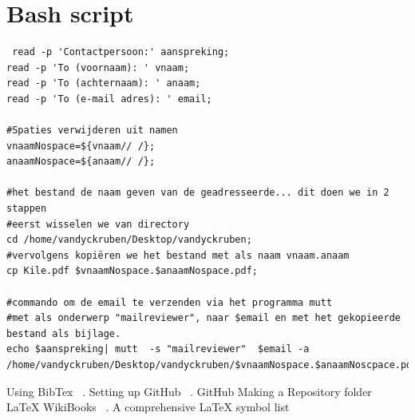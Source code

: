 \documentclass[12pt]{article} %
\begin{document}
\section{Bash script}
\begin{lstlisting}
 read -p 'Contactpersoon:' aanspreking;
read -p 'To (voornaam): ' vnaam;
read -p 'To (achternaam): ' anaam;
read -p 'To (e-mail adres): ' email;

#Spaties verwijderen uit namen
vnaamNospace=${vnaam// /};
anaamNospace=${anaam// /};

#het bestand de naam geven van de geadresseerde... dit doen we in 2 stappen
#eerst wisselen we van directory
cd /home/vandyckruben/Desktop/vandyckruben;
#vervolgens kopiëren we het bestand met als naam vnaam.anaam
cp Kile.pdf $vnaamNospace.$anaamNospace.pdf;

#commando om de email te verzenden via het programma mutt
#met als onderwerp "mailreviewer", naar $email en met het gekopieerde bestand als bijlage.
echo $aanspreking| mutt  -s "mailreviewer"  $email -a /home/vandyckruben/Desktop/vandyckruben/$vnaamNospace.$anaamNoscpace.pdf;
\end{lstlisting}














\newpage
\listoffigures \label{Lijst van figuren}
\newpage
\listoftables \label{Lijst van tabellen}


\newpage
\printindex \label{Index}




Using BibTex ~\cite{BibTex}.
Setting up GitHub ~\cite{GitHub Setup}.
GitHub Making a Repository folder ~\cite{GitHub Repo}
LaTeX WikiBooks ~\cite{WikiBooks}.
A comprehensive LaTeX symbol list ~\cite{Symbol list}




{}






\end{document}
